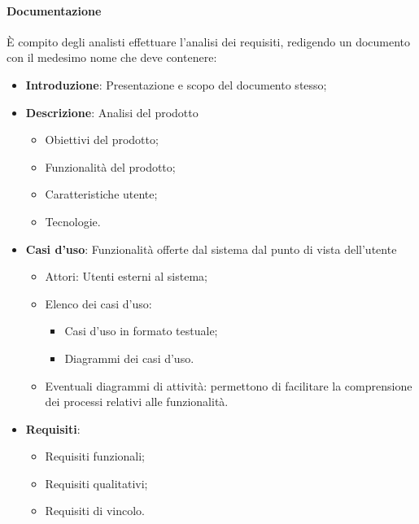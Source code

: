\paragraph{Documentazione}
È compito degli analisti effettuare l'analisi dei requisiti, redigendo un documento con il medesimo nome che deve contenere:
\begin{itemize}
    \item \textbf{Introduzione}: Presentazione e scopo del documento stesso;
    \item \textbf{Descrizione}: Analisi del prodotto
          \begin{itemize}
              \item Obiettivi del prodotto;
              \item Funzionalità del prodotto;
              \item Caratteristiche utente;
              \item Tecnologie.
          \end{itemize}
    \item \textbf{Casi d'uso}: Funzionalità offerte dal sistema dal punto di vista dell'utente
        \begin{itemize}
            \item Attori: Utenti esterni al sistema;
            \item Elenco dei casi d'uso:
            \begin{itemize}
                \item Casi d'uso in formato testuale;
                \item Diagrammi dei casi d'uso.
            \end{itemize}  
            \item Eventuali diagrammi di attività: permettono di facilitare la comprensione dei processi relativi alle funzionalità.
        \end{itemize}
    \item \textbf{Requisiti}:
        \begin{itemize}
            \item Requisiti funzionali;
            \item Requisiti qualitativi;
            \item Requisiti di vincolo.
        \end{itemize}
\end{itemize}
